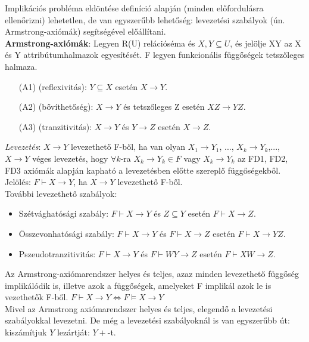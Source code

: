 \documentclass[tikz,12pt,margin=0px]{article}
\begin{document}
{    \noindent Implikációs probléma eldöntése definíció alapján (minden előfordulásra ellenőrizni) lehetetlen, de van egyszerűbb lehetőség: levezetési szabályok (ún. Armstrong-axiómák) segítségével előállítani.\\

    \noindent \textbf{Armstrong-axiómák}: Legyen R(U) relációséma és $X,Y \subseteq U$, és jelölje XY az X és Y attribútumhalmazok egyesítését. F legyen funkcionális függőségek tetszőleges halmaza.
	\begin{itemize}
		\item[(A1)] (reflexivitás): $Y \subseteq X$ esetén $X \to Y$.
		\item[(A2)] (bővíthetőség): $X \to Y$ és tetszőleges Z esetén $XZ \to YZ$.
		\item[(A3)] (tranzitivitás): $X \to Y$ és $Y \to Z$ esetén $X \to Z$.		
	\end{itemize}

    \noindent \textit{Levezetés}: $X \to Y$ levezethető F-ből, ha van olyan $X_1 \to Y_1$, ..., $X_k \to Y_k$,..., $X \to Y$ véges levezetés, hogy $\forall k$-ra $X_k \to Y_k \in F$ vagy $X_k \to Y_k$ az FD1, FD2, FD3 axiómák alapján kapható a levezetésben előtte szereplő függőségekből. Jelölés: $F \vdash X \to Y$, ha $X \to Y$ levezethető F-ből. \\

	\noindent További levezethető szabályok:
    \begin{itemize}
		\item Szétvághatósági szabály: $F \vdash X \to Y$ és $Z \subseteq Y$ esetén $F \vdash X \to Z$.
		\item Összevonhatósági szabály: $F \vdash X \to Y$ és $F \vdash X \to Z$ esetén $F \vdash X \to YZ$.
		\item Pszeudotranzitivitás: $F \vdash X \to Y$ és $F \vdash WY \to Z$ esetén $F \vdash XW \to Z$.
	\end{itemize}

    \noindent Az Armstrong-axiómarendszer helyes és teljes, azaz minden levezethető függőség implikálódik is, illetve azok a függőségek, amelyeket F implikál azok le is vezethetők F-ből. $F \vdash X \to Y \iff F \models X \to Y$\\

    \noindent Mivel az Armstrong axiómarendszer helyes és teljes, elegendő a levezetési szabályokkal levezetni. De még a levezetési szabályoknál is van egyszerűbb út: kiszámítjuk $Y$ lezártját: $Y+$-t.\\

}
\end{document}
